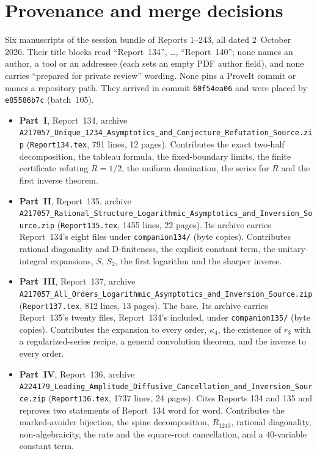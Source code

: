 \documentclass[11pt,letterpaper]{article}
\theoremstyle{remark}\newtheorem{remark}[theorem]{Remark}
\numberwithin{equation}{section}
\newcommand{\file}[1]{\nolinkurl{#1}}
\begin{document}
\section*{Provenance and merge decisions}\label{upo:sec:provenance}
Six manuscripts of the session bundle of Reports 1--243, all dated 2~October 2026. Their title blocks read ``Report~134'', \ldots, ``Report~140''; none names an author, a tool or an addressee (each sets an empty PDF author field), and none carries ``prepared for private review'' wording. None pins a ProveIt commit or names a repository path. They arrived in commit \texttt{60f54ea06} and were placed by \texttt{e85586b7c} (batch~105).
\begin{itemize}
\item \textbf{Part~I}, Report~134, archive \file{A217057_Unique_1234_Asymptotics_and_Conjecture_Refutation_Source.zip} (\file{Report134.tex}, 791 lines, 12 pages). Contributes the exact two-half decomposition, the tableau formula, the fixed-boundary limits, the finite certificate refuting $R=1/2$, the uniform domination, the series for $R$ and the first inverse theorem.
\item \textbf{Part~II}, Report~135, archive \file{A217057_Rational_Structure_Logarithmic_Asymptotics_and_Inversion_Source.zip} (\file{Report135.tex}, 1455 lines, 22 pages). Its archive carries Report~134's eight files under \file{companion134/} (byte copies). Contributes rational diagonality and D-finiteness, the explicit constant term, the unitary-integral expansions, $S$, $S_2$, the first logarithm and the sharper inverse.
\item \textbf{Part~III}, Report~137, archive \file{A217057_All_Orders_Logarithmic_Asymptotics_and_Inversion_Source.zip} (\file{Report137.tex}, 812 lines, 13 pages). The base. Its archive carries Report~135's twenty files, Report~134's included, under \file{companion135/} (byte copies). Contributes the expansion to every order, $\kappa_4$, the existence of $r_3$ with a regularized-series recipe, a general convolution theorem, and the inverse to every order.
\item \textbf{Part~IV}, Report~136, archive \file{A224179_Leading_Amplitude_Diffusive_Cancellation_and_Inversion_Source.zip} (\file{Report136.tex}, 1737 lines, 24 pages). Cites Reports 134 and 135 and reproves two statements of Report~134 word for word. Contributes the marked-avoider bijection, the spine decomposition, $R_{1243}$, rational diagonality, non-algebraicity, the rate and the square-root cancellation, and a 40-variable constant term.

\end{itemize}
\end{document}
